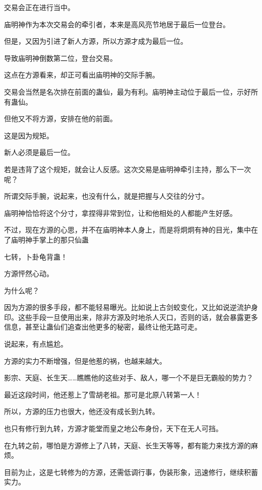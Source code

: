 
\begin{this_body}

交易会正在进行当中。

庙明神作为本次交易会的牵引者，本来是高风亮节地居于最后一位登台。

但是，又因为引进了新人方源，所以方源才成为最后一位。

导致庙明神倒数第二位，登台交易。

这点在方源看来，却正可看出庙明神的交际手腕。

交易会当然是名次排在前面的蛊仙，最为有利。庙明神主动位于最后一位，示好所有蛊仙。

但他又不将方源，安排在他的前面。

这是因为规矩。

新人必须是最后一位。

若是违背了这个规矩，就会让人反感。这次交易是庙明神牵引主持，那么下一次呢？

所谓交际手腕，说起来，也没有什么，就是把握与人交往的分寸。

庙明神恰恰将这个分寸，拿捏得非常到位，让和他相处的人都能产生好感。

不过，现在方源的心思，并不在庙明神本人身上，而是将炯炯有神的目光，集中在了庙明神手掌上的那只仙蛊

七转，卜卦龟背蛊！

方源怦然心动。

为什么呢？

因为方源的很多手段，都不能轻易曝光。比如说上古剑蛟变化，又比如说逆流护身印。这些手段一旦使用出来，除非方源及时地杀人灭口，否则的话，就会暴露更多信息，甚至让蛊仙们追查出他更多的秘密，最终让他无路可走。

说起来，有点尴尬。

方源的实力不断增强，但是他惹的祸，也越来越大。

影宗、天庭、长生天……瞧瞧他的这些对手、敌人，哪一个不是巨无霸般的势力？

最近这段时间，他还惹上了雪胡老祖。那可是北原八转第一人！

所以，方源的压力也很大，他还没有成长到九转。

也只有修行到九转，方源才能堂而皇之地公布身份，天下在无人可挡。

在九转之前，哪怕是方源修上了八转，天庭、长生天等等，都有能力来找方源的麻烦。

目前为止，这是七转修为的方源，还需低调行事，伪装形象，迅速修行，继续积蓄实力。


\end{this_body}
